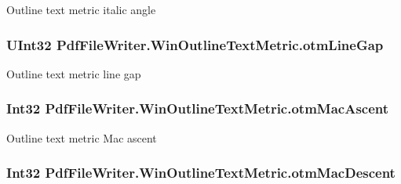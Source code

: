 Outline text metric italic angle 

\subsubsection[{\texorpdfstring{otm\+Line\+Gap}{otmLineGap}}]{\setlength{\rightskip}{0pt plus 5cm}U\+Int32 Pdf\+File\+Writer.\+Win\+Outline\+Text\+Metric.\+otm\+Line\+Gap\hspace{0.3cm}{\ttfamily [get]}}\hypertarget{class_pdf_file_writer_1_1_win_outline_text_metric_a8a8b8cee38d6b5a25e830874e03d5d5e}{}\label{class_pdf_file_writer_1_1_win_outline_text_metric_a8a8b8cee38d6b5a25e830874e03d5d5e}


Outline text metric line gap 

\subsubsection[{\texorpdfstring{otm\+Mac\+Ascent}{otmMacAscent}}]{\setlength{\rightskip}{0pt plus 5cm}Int32 Pdf\+File\+Writer.\+Win\+Outline\+Text\+Metric.\+otm\+Mac\+Ascent\hspace{0.3cm}{\ttfamily [get]}}\hypertarget{class_pdf_file_writer_1_1_win_outline_text_metric_a1ae7279adba389ab41264c64619d0dac}{}\label{class_pdf_file_writer_1_1_win_outline_text_metric_a1ae7279adba389ab41264c64619d0dac}


Outline text metric Mac ascent 

\subsubsection[{\texorpdfstring{otm\+Mac\+Descent}{otmMacDescent}}]{\setlength{\rightskip}{0pt plus 5cm}Int32 Pdf\+File\+Writer.\+Win\+Outline\+Text\+Metric.\+otm\+Mac\+Descent\hspace{0.3cm}{\ttfamily [get]}}\hypertarget{class_pdf_file_writer_1_1_win_outline_text_metric_aa7dee7dc0aed33e1b7d9a75ba41b73ac}{}\label{class_pdf_file_writer_1_1_win_outline_text_metric_aa7dee7dc0aed33e1b7d9a75ba41b73ac}


